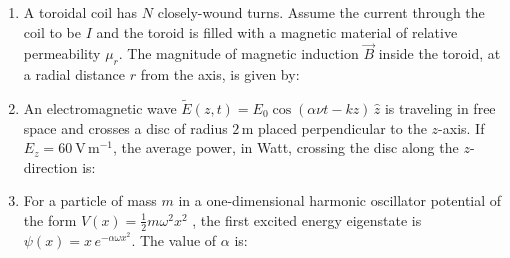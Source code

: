 \documentclass[journal,12pt,onecolumn]{IEEEtran}
\begin{document}
\begin{enumerate}[itemsep = 1em]
\item A toroidal coil has $N$ closely-wound turns. Assume the current through the coil to be $I$ and the toroid is filled with a magnetic material of relative permeability $\mu_{r}$. The magnitude of magnetic induction $\vec{B}$ inside the toroid, at a radial distance $r$ from the axis, is given by:

\hfill{}

\begin{enumerate}
\end{enumerate}

\item An electromagnetic wave $\tilde{E}(z,t) = E_{0} \cos(\alpha \nu t - kz) \, \hat{z}$ is traveling in free space and crosses a disc of radius $2\,\text{m}$ placed perpendicular to the $z$-axis. If $E_{z} = 60 \ \mathrm{V \, m^{-1}}$, the average power, in Watt, crossing the disc along the $z$-direction is:

\hfill{}

\begin{enumerate}
\end{enumerate}

\item For a particle of mass $m$ in a one-dimensional harmonic oscillator potential of the form  $V(x) = \frac{1}{2} m \omega^{2} x^{2}$ , the first excited energy eigenstate is $\psi(x) = x \, e^{ -\alpha \omega x^{2} }$. The value of $\alpha$ is:

\hfill{}

\begin{enumerate}
\end{enumerate}


\end{enumerate}
\end{document}
